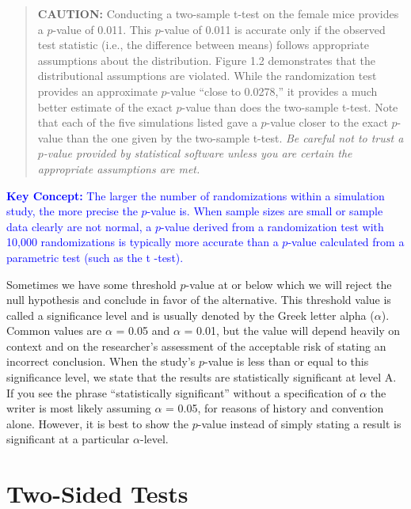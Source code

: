 \documentclass[
]{book}
\begin{document}
\begin{quote}
\textbf{CAUTION:}
Conducting a two-sample t-test on the female mice provides a \(p\)-value of 0.011. This \(p\)-value of 0.011 is accurate only if the observed test statistic (i.e., the difference between means) follows appropriate assumptions about the distribution. Figure 1.2 demonstrates that the distributional assumptions are violated. While the randomization test provides an approximate \(p\)-value ``close to 0.0278,'' it provides a much better estimate of the exact \(p\)-value than does the two-sample t-test. Note that each of the five simulations listed gave a \(p\)-value closer to the exact \(p\)-value than the one given by the two-sample t-test. \textit{Be careful not to trust a $p$-value provided by statistical software unless you are certain the appropriate assumptions are met.}
\end{quote}

\textbf{\textcolor{blue}{Key Concept:}}
\textcolor{blue}{The larger the number of randomizations within a simulation study, the more precise the $p$-value is. When sample sizes are small or sample data clearly are not normal, a $p$-value derived from a randomization test with 10,000 randomizations is typically more accurate than a $p$-value calculated from a parametric test (such as the t -test).}

Sometimes we have some threshold \(p\)-value at or below which we will reject the null hypothesis and conclude in favor of the alternative. This threshold value is called a significance level and is usually denoted by the Greek letter alpha (\(\alpha\)). Common values are \(\alpha\) = 0.05 and \(\alpha\) = 0.01, but the value will depend heavily
on context and on the researcher's assessment of the acceptable risk of stating an incorrect conclusion. When the study's \(p\)-value is less than or equal to this significance level, we state that the results are statistically significant at level A. If you see the phrase ``statistically significant'' without a specification of \(\alpha\) the writer is most likely assuming \(\alpha\) = 0.05, for reasons of history and convention alone. However, it is best to show the \(p\)-value instead of simply stating a result is significant at a particular \(\alpha\)-level.

\hypertarget{two-sided-tests}{%
\section{Two-Sided Tests}\label{two-sided-tests}}
\end{document}
